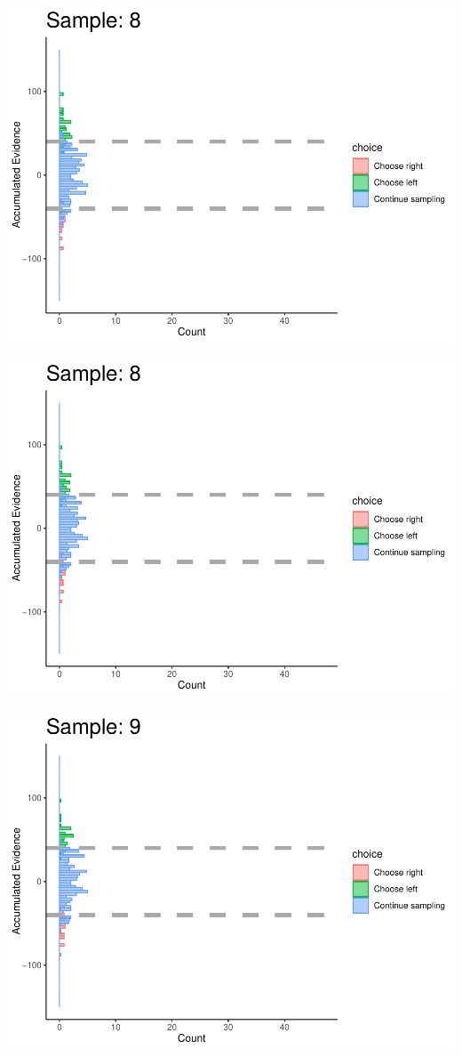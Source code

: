 \documentclass[
]{book}
\begin{document}
\begin{center}\includegraphics[width=0.8\linewidth]{LateNightBayes_files/figure-latex/collapsing_check-77} \end{center}

\begin{center}\includegraphics[width=0.8\linewidth]{LateNightBayes_files/figure-latex/collapsing_check-78} \end{center}

\begin{center}\includegraphics[width=0.8\linewidth]{LateNightBayes_files/figure-latex/collapsing_check-79} \end{center}
\end{document}
